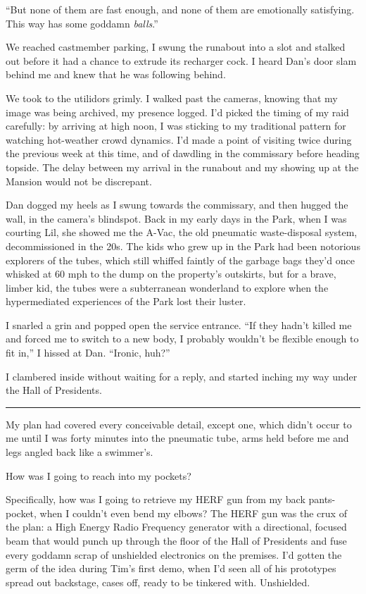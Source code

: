 “But none of them are fast enough, and none of them are emotionally
satisfying. This way has some goddamn \emph{balls}.”

We reached castmember parking, I swung the runabout into a slot and
stalked out before it had a chance to extrude its recharger cock. I
heard Dan's door slam behind me and knew that he was following
behind.

We took to the utilidors grimly. I walked past the cameras, knowing
that my image was being archived, my presence logged. I'd picked
the timing of my raid carefully: by arriving at high noon, I was
sticking to my traditional pattern for watching hot-weather crowd
dynamics. I'd made a point of visiting twice during the previous
week at this time, and of dawdling in the commissary before heading
topside. The delay between my arrival in the runabout and my
showing up at the Mansion would not be discrepant.

Dan dogged my heels as I swung towards the commissary, and then
hugged the wall, in the camera's blindspot. Back in my early days
in the Park, when I was courting Lil, she showed me the A-Vac, the
old pneumatic waste-disposal system, decommissioned in the 20s. The
kids who grew up in the Park had been notorious explorers of the
tubes, which still whiffed faintly of the garbage bags they'd once
whisked at 60 mph to the dump on the property's outskirts, but for
a brave, limber kid, the tubes were a subterranean wonderland to
explore when the hypermediated experiences of the Park lost their
luster.

I snarled a grin and popped open the service entrance. “If they
hadn't killed me and forced me to switch to a new body, I probably
wouldn't be flexible enough to fit in,” I hissed at Dan. “Ironic,
huh?”

I clambered inside without waiting for a reply, and started inching
my way under the Hall of Presidents.

\begin{center}\rule{3in}{0.4pt}\end{center}

My plan had covered every conceivable detail, except one, which
didn't occur to me until I was forty minutes into the pneumatic
tube, arms held before me and legs angled back like a swimmer's.

How was I going to reach into my pockets?

Specifically, how was I going to retrieve my HERF gun from my back
pants-pocket, when I couldn't even bend my elbows? The HERF gun was
the crux of the plan: a High Energy Radio Frequency generator with
a directional, focused beam that would punch up through the floor
of the Hall of Presidents and fuse every goddamn scrap of
unshielded electronics on the premises. I'd gotten the germ of the
idea during Tim's first demo, when I'd seen all of his prototypes
spread out backstage, cases off, ready to be tinkered with.
Unshielded.

